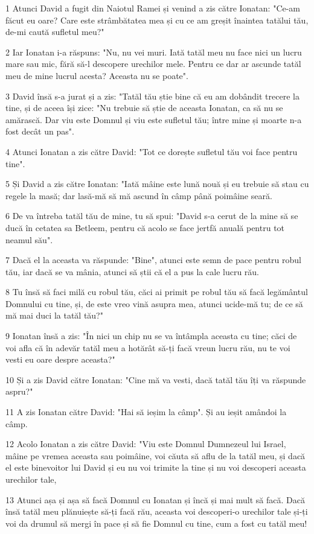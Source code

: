 \par 1 Atunci David a fugit din Naiotul Ramei și venind a zis către Ionatan: "Ce-am făcut eu oare? Care este strâmbătatea mea și cu ce am greșit înaintea tatălui tău, de-mi caută sufletul meu?"
\par 2 Iar Ionatan i-a răspuns: "Nu, nu vei muri. Iată tatăl meu nu face nici un lucru mare sau mic, fără să-l descopere urechilor mele. Pentru ce dar ar ascunde tatăl meu de mine lucrul acesta? Aceasta nu se poate".
\par 3 David însă s-a jurat și a zis: "Tatăl tău știe bine că eu am dobândit trecere la tine, și de aceea își zice: "Nu trebuie să știe de aceasta Ionatan, ca să nu se amărască. Dar viu este Domnul și viu este sufletul tău; între mine și moarte n-a fost decât un pas".
\par 4 Atunci Ionatan a zis către David: "Tot ce dorește sufletul tău voi face pentru tine".
\par 5 Și David a zis către Ionatan: "Iată mâine este lună nouă și eu trebuie să stau cu regele la masă; dar lasă-mă să mă ascund în câmp până poimâine seară.
\par 6 De va întreba tatăl tău de mine, tu să spui: "David s-a cerut de la mine să se ducă în cetatea sa Betleem, pentru că acolo se face jertfă anuală pentru tot neamul său".
\par 7 Dacă el la aceasta va răspunde: "Bine", atunci este semn de pace pentru robul tău, iar dacă se va mânia, atunci să știi că el a pus la cale lucru rău.
\par 8 Tu însă să faci milă cu robul tău, căci ai primit pe robul tău să facă legământul Domnului cu tine, și, de este vreo vină asupra mea, atunci ucide-mă tu; de ce să mă mai duci la tatăl tău?"
\par 9 Ionatan însă a zis: "În nici un chip nu se va întâmpla aceasta cu tine; căci de voi afla că în adevăr tatăl meu a hotărât să-ți facă vreun lucru rău, nu te voi vesti eu oare despre aceasta?"
\par 10 Și a zis David către Ionatan: "Cine mă va vesti, dacă tatăl tău îți va răspunde aspru?"
\par 11 A zis Ionatan către David: "Hai să ieșim la câmp". Și au ieșit amândoi la câmp.
\par 12 Acolo Ionatan a zis către David: "Viu este Domnul Dumnezeul lui Israel, mâine pe vremea aceasta sau poimâine, voi căuta să aflu de la tatăl meu, și dacă el este binevoitor lui David și eu nu voi trimite la tine și nu voi descoperi aceasta urechilor tale,
\par 13 Atunci așa și așa să facă Domnul cu Ionatan și încă și mai mult să facă. Dacă însă tatăl meu plănuiește să-ți facă rău, aceasta voi descoperi-o urechilor tale și-ți voi da drumul să mergi în pace și să fie Domnul cu tine, cum a fost cu tatăl meu!
